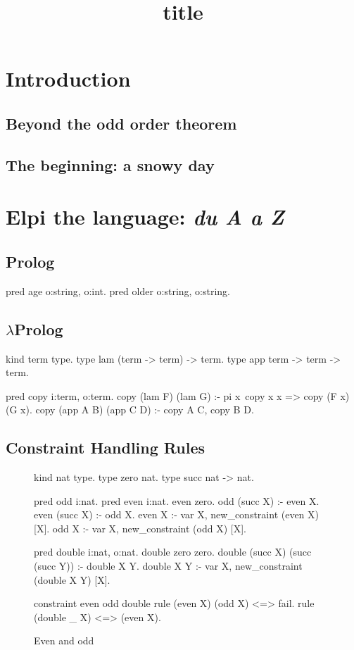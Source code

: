 \documentclass[a4paper, 11pt]{book}
\title{title}
\begin{document}
\setcounter{tocdepth}{4}
\tableofcontents

\chapter{Introduction}

\section{Beyond the odd order theorem}
\section{The beginning: a snowy day}

\chapter{Elpi the language: \emph{du A a Z}}
\cite{duaz}

\section{Prolog}

\begin{elpicode}
pred age o:string, o:int.
pred older o:string, o:string.
\end{elpicode}
    

\section{$\lambda$Prolog}

\begin{elpicode}
kind term type.
type lam (term -> term) -> term.
type app term -> term -> term.

pred copy i:term, o:term.
copy (lam F) (lam G) :- pi x\ copy x x => copy (F x) (G x).
copy (app A B) (app C D) :- copy A C, copy B D.
\end{elpicode}

\section{Constraint Handling Rules}

\begin{figure}
\begin{elpicode}
kind nat type.
type zero nat.
type succ nat -> nat.

pred odd i:nat.
pred even i:nat.
even zero.
odd (succ X) :- even X.
even (succ X) :- odd X.
even X :- var X, new_constraint (even X) [X].
odd X :- var X, new_constraint (odd X) [X].

pred double i:nat, o:nat.
double zero zero.
double (succ X) (succ (succ Y)) :- double X Y.
double X Y :- var X, new_constraint (double X Y) [X].

constraint even odd double {
  rule (even X) (odd X) <=> fail.
  rule (double _ X) <=> (even X).
}
\end{elpicode}
\caption[even odd]{Even and odd}
\end{figure}
\end{document}
